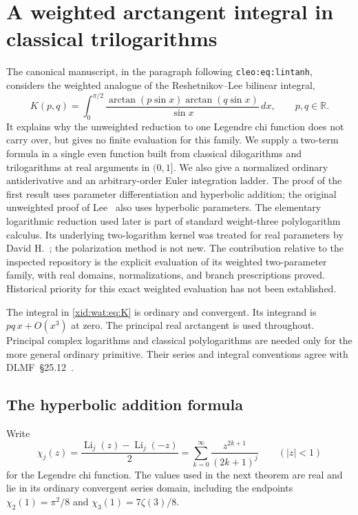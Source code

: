 \section{A weighted arctangent integral in classical trilogarithms}
\label{xid:wat:sec}

The canonical manuscript, in the paragraph following
\texttt{cleo:eq:lintanh}, considers the weighted analogue of the
Reshetnikov--Lee bilinear integral,
\begin{equation}\label{xid:wat:eq:K}
 K(p,q)=\int_0^{\pi/2}
 \frac{\arctan(p\sin x)\arctan(q\sin x)}{\sin x}\,dx,
 \qquad p,q\in\mathbb R.
\end{equation}
It explains why the unweighted reduction to one Legendre chi function
does not carry over, but gives no finite evaluation for this family.
We supply a two-term formula in a single even function built from
classical dilogarithms and trilogarithms at real arguments in $(0,1]$.
We also give a normalized ordinary antiderivative and an
arbitrary-order Euler integration ladder. The proof of the first
result uses parameter differentiation and hyperbolic addition;
the original unweighted proof of Lee~\cite{wat:Lee} also uses
hyperbolic parameters. The elementary logarithmic reduction used
later is part of standard weight-three polylogarithm calculus.
Its underlying two-logarithm kernel was treated for real parameters
by David H.~\cite{wat:DavidH}; the polarization method is not new.
The contribution relative to the inspected repository is the explicit
evaluation of its weighted two-parameter family, with real domains,
normalizations, and branch prescriptions proved. Historical priority
for this exact weighted evaluation has not been established.

The integral in \eqref{xid:wat:eq:K} is ordinary and convergent. Its integrand
is $pq\,x+O(x^3)$ at zero. The principal real arctangent is used
throughout. Principal complex logarithms and classical polylogarithms
are needed only for the more general ordinary primitive. Their series and integral
conventions agree with DLMF~\S25.12~\cite{wat:DLMF}.

\subsection{The hyperbolic addition formula}

Write
\[
 \chi_j(z)=\frac{\operatorname{Li}_j(z)-\operatorname{Li}_j(-z)}2
          =\sum_{k=0}^{\infty}\frac{z^{2k+1}}{(2k+1)^j}
 \qquad (|z|<1)
\]
for the Legendre chi function. The values used in the next theorem
are real and lie in its ordinary convergent series domain, including
the endpoints $\chi_2(1)=\pi^2/8$ and
$\chi_3(1)=7\zeta(3)/8$.

